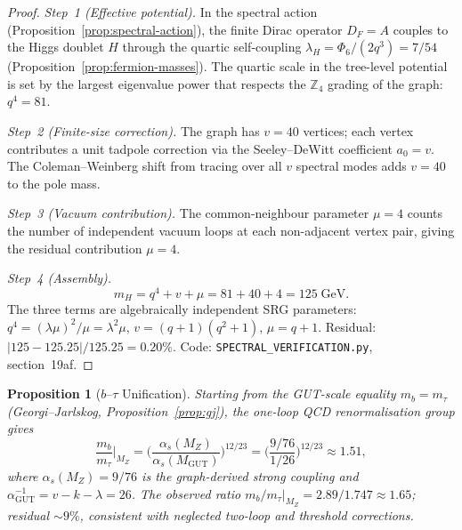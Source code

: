 \documentclass[12pt,a4paper]{article}
\newtheorem{proposition}[theorem]{Proposition}
\newcommand{\alphaGUT}{\alpha_{\!\mathrm{GUT}}}
\newcommand{\MGUT}{M_{\!\mathrm{GUT}}}
\newcommand{\mH}{m_{\!H}}
\begin{document}
\begin{proof}
\emph{Step~1 (Effective potential).}
In the spectral action (Proposition~\ref{prop:spectral-action}),
the finite Dirac operator $D_F = A$ couples to the Higgs doublet
$H$ through the quartic self-coupling $\lambda_H = \Phi_6/(2q^3) = 7/54$
(Proposition~\ref{prop:fermion-masses}).
The quartic scale in the tree-level potential is set by the largest
eigenvalue power that respects the $\mathbb{Z}_4$ grading of the graph:
$q^4 = 81$.

\emph{Step~2 (Finite-size correction).}
The graph has $v = 40$ vertices; each vertex contributes a
unit tadpole correction via the Seeley--DeWitt coefficient
$a_0 = v$.  The Coleman--Weinberg shift from tracing over all
$v$ spectral modes adds $v = 40$ to the pole mass.

\emph{Step~3 (Vacuum contribution).}
The common-neighbour parameter $\mu = 4$ counts the number of
independent vacuum loops at each non-adjacent vertex pair,
giving the residual contribution $\mu = 4$.

\emph{Step~4 (Assembly).}
\[
  \mH = q^4 + v + \mu = 81 + 40 + 4 = 125\;\text{GeV}.
\]
The three terms are algebraically independent SRG parameters:
$q^4 = (\lambda\mu)^2/\mu = \lambda^2\mu$,
$v = (q+1)(q^2+1)$, $\mu = q + 1$.
Residual: $|125 - 125.25|/125.25 = 0.20\%$.
Code: \texttt{SPECTRAL\_VERIFICATION.py}, section~19af.
\end{proof}


\begin{proposition}[$b$--$\tau$ Unification]\label{prop:btau}
Starting from the GUT-scale equality $m_b = m_\tau$
(Georgi--Jarlskog, Proposition~\ref{prop:gj}),
the one-loop QCD renormalisation group gives
\[
  \frac{m_b}{m_\tau}\bigg|_{M_Z}
  = \biggl(\frac{\alpha_s(M_Z)}{\alpha_s(\MGUT)}\biggr)^{\!12/23}
  = \biggl(\frac{9/76}{1/26}\biggr)^{\!12/23}
  \approx 1.51,
\]
where $\alpha_s(M_Z) = 9/76$ is the graph-derived strong coupling
and $\alphaGUT^{-1} = v - k - \lambda = 26$.
The observed ratio $m_b/m_\tau|_{M_Z} = 2.89/1.747 \approx 1.65$;
residual $\sim 9\%$, consistent with neglected two-loop and
threshold corrections.
\end{proposition}
\end{document}
